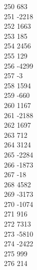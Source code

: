 { 250	683 \\
 251	-2218 \\
 252	1663 \\
 253	185 \\
 254	2456 \\
 255	129 \\
 256	-4299 \\
 257	-3 \\
 258	1594 \\
 259	-660 \\
 260	1167 \\
 261	-2188 \\
 262	1697 \\
 263	712 \\
 264	3124 \\
 265	-2284 \\
 266	-1873 \\
 267	-18 \\
 268	4582 \\
 269	-3173 \\
 270	-1074 \\
 271	916 \\
 272	7313 \\
 273	-5810 \\
 274	-2422 \\
 275	999 \\
 276	214 \\
}
